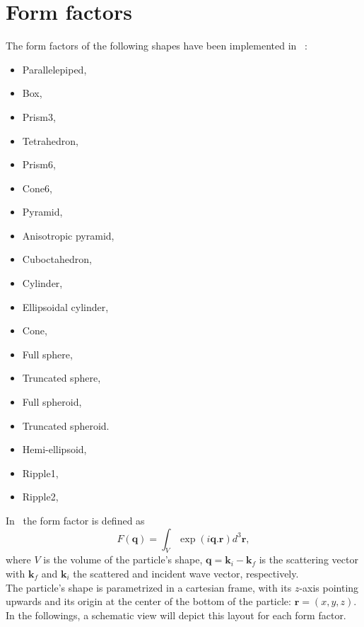 \chapter{Form factors} \label{appendixff}

The form factors of the following shapes have been implemented in \BornAgain\ :
\begin{itemize}
\item Parallelepiped,   
\item Box,  
\item Prism3,   
\item Tetrahedron,  
\item Prism6,   
\item Cone6,  
\item Pyramid,  
\item Anisotropic pyramid,  
\item Cuboctahedron,   
\item Cylinder,  
\item Ellipsoidal cylinder,  
\item Cone,  
\item Full sphere,  
\item Truncated sphere,  
\item Full spheroid,   
\item Truncated spheroid.  
\item Hemi-ellipsoid,   
\item Ripple1,   
\item Ripple2,   
\end{itemize}

In \BornAgain\ the form factor is defined as
\begin{equation*}
F(\mathbf{q})=\int_V \exp (i\mathbf{q}.\mathbf{r}) d^3 \mathbf{r},
\end{equation*}
where $V$ is the volume of the particle's shape,
$\mathbf{q}=\mathbf{k}_i - \mathbf{k}_f$ is the scattering vector with
$\mathbf{k}_f$ and $\mathbf{k}_i$ the scattered and incident wave
vector, respectively.\\

The particle's shape is parametrized in a cartesian frame, with its
$z$-axis pointing upwards and its origin at the center of the bottom
of the particle: $\mathbf{r}=(x,y,z)$. In the followings, a schematic view will depict this layout for each
form factor.\\


